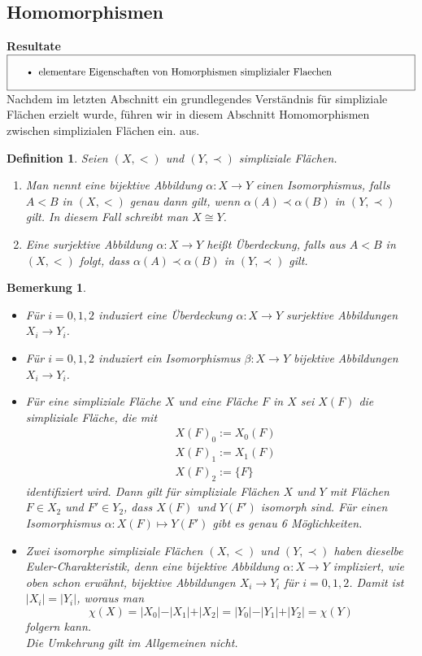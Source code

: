 \documentclass[12pt,titlepage,twoside,cleardoublepage]{article}
\theoremstyle{nummermitklammern}
\newtheorem{definition}[temp]{Definition}
\newtheorem{bemerkung}[temp]{Bemerkung}
\newtheorem{definition}[zahl]{Definition}
\newtheorem{bemerkung}[zahl]{Bemerkung}
\numberwithin{equation}{section}
\begin{document}
\subsection{Homomorphismen}
\textbf{Resultate}\\
$\fbox{
\parbox{14cm}{\begin{itemize}
\item elementare Eigenschaften von Homorphismen simplizialer Flaechen
\end{itemize}
}}$\\
Nachdem im letzten Abschnitt ein grundlegendes Verständnis für simpliziale Flächen erzielt wurde, führen wir in diesem Abschnitt Homomorphismen zwischen simplizialen Flächen ein.
aus.
\begin{definition} Seien $(X,<)$ und $(Y,\prec)$ simpliziale Flächen.
\begin{enumerate}
 \item Man nennt eine bijektive Abbildung $\alpha: X \to Y$ einen Isomorphismus, falls $A<B$ in $(X,<)$ genau dann gilt, wenn $\alpha(A) \prec \alpha(B)$ in $(Y,\prec)$ gilt. In diesem Fall schreibt man $X \cong Y$.
\item Eine surjektive Abbildung $\alpha: X \to Y$ heißt Überdeckung, falls aus $A<B$ in $(X,<)$ folgt, dass $\alpha(A) \prec \alpha(B)$ in $(Y,\prec)$ gilt. 
\end{enumerate}
\end{definition}
\begin{bemerkung}
\begin{itemize}
\item

Für $i=0,1,2$ induziert eine Überdeckung $\alpha:X\to Y$ surjektive Abbildungen $X_{i} \to Y_{i}$.
\item 
Für $i=0,1,2$ induziert ein Isomorphismus $\beta:X \to Y$  bijektive Abbildungen $X_{i} \to Y_{i}$.
\item
Für eine simpliziale Fläche $X$ und eine Fläche $F$ in $X$ sei $X(F)$ die simpliziale Fläche, die mit 
\begin{align*}
&X(F)_0:=X_0(F)\\
&X(F)_1:= X_1(F)\\
&X(F)_2:= \{F\} 
\end{align*}
 identifiziert wird.
Dann gilt für simpliziale Flächen $X$ und $Y$ mit Flächen $F \in X_2$ und $F' \in Y_2$, dass $X(F)$ und $Y(F')$ isomorph sind. Für einen Isomorphismus $\alpha : X(F)\mapsto Y(F')$ gibt es genau 6 Möglichkeiten.
\item
 Zwei isomorphe simpliziale Flächen $(X,<)$ und $(Y, \prec)$ haben dieselbe Euler-Charakteristik, denn eine bijektive Abbildung $\alpha:X \to Y$ impliziert, wie oben schon erwähnt, bijektive Abbildungen  $X_i \to Y_i$ für $i=0,1,2$. Damit ist $\vert X_i \vert =\vert Y_i \vert $, woraus man
 \[
\chi(X) =\vert X_0 \vert - \vert X_1\vert +\vert X_2 \vert = \vert Y_0 \vert - \vert Y_1\vert +\vert Y_2 \vert =\chi(Y)
 \]
 folgern kann. \\
 Die Umkehrung gilt im Allgemeinen nicht.
\end{itemize}
\end{bemerkung}
\end{document}

